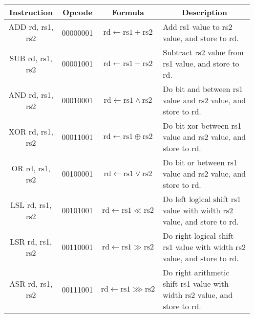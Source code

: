 \documentclass[a4paper,10pt]{article}
\begin{document}
\begin{center}
    \begin{tabularx}{\textwidth}{|c|c|c|X|} \hline
      Instruction & Opcode & Formula & \multicolumn{1}{c|}{Description} \\ \hline \hline
      ADD rd, rs1, rs2 & 00000001 & $\mathrm{rd} \leftarrow \mathrm{rs1} + \mathrm{rs2}$ &
      Add rs1 value to rs2 value, and store to rd. \\ \hline
      SUB rd, rs1, rs2 & 00001001 & $\mathrm{rd} \leftarrow \mathrm{rs1} - \mathrm{rs2}$ &
      Subtract rs2 value from rs1 value, and store to rd.  \\ \hline
      AND rd, rs1, rs2 & 00010001 & $\mathrm{rd} \leftarrow \mathrm{rs1} \land \mathrm{rs2}$ &
      Do bit and between rs1 value and rs2 value, and store to rd.  \\ \hline
      XOR rd, rs1, rs2 & 00011001 & $\mathrm{rd} \leftarrow \mathrm{rs1} \oplus \mathrm{rs2}$ &
      Do bit xor between rs1 value and rs2 value, and store to rd.  \\ \hline
      OR  rd, rs1, rs2 & 00100001 & $\mathrm{rd} \leftarrow \mathrm{rs1} \lor \mathrm{rs2}$ &
      Do bit or between rs1 value and rs2 value, and store to rd.  \\ \hline
      LSL rd, rs1, rs2 & 00101001 & $\mathrm{rd} \leftarrow \mathrm{rs1} \ll \mathrm{rs2}$ &
      Do left logical shift rs1 value with width rs2 value, and store to rd. \\ \hline
      LSR rd, rs1, rs2 & 00110001 & $\mathrm{rd} \leftarrow \mathrm{rs1} \gg \mathrm{rs2}$ &
      Do right logical shift rs1 value with width rs2 value, and store to rd. \\ \hline
      ASR rd, rs1, rs2 & 00111001 & $\mathrm{rd} \leftarrow \mathrm{rs1} \ggg \mathrm{rs2}$ &
      Do right arithmetic shift rs1 value with width rs2 value, and store to rd.\\ \hline
    \end{tabularx}
\end{center}
\end{document}
